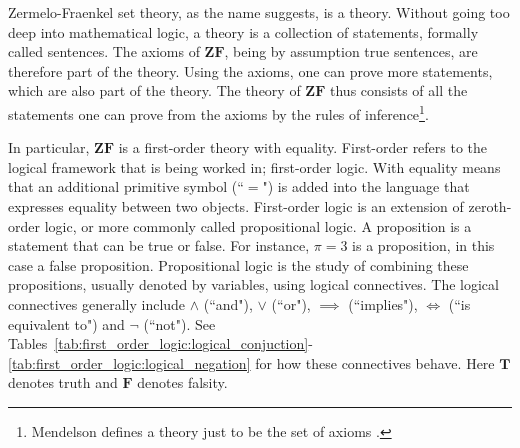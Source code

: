 \documentclass[../main.tex]{subfiles}
\begin{document}
\setcounter{section}{1}
Zermelo-Fraenkel set theory, as the name suggests, is a theory. Without going too deep into mathematical logic, a theory is a collection of statements, formally called sentences. The axioms of $\mathbf{ZF}$, being by assumption true sentences, are therefore part of the theory. Using the axioms, one can prove more statements, which are also part of the theory. The theory of $\mathbf{ZF}$ thus consists of all the statements one can prove from the axioms by the rules of inference\footnote{Mendelson defines a theory just to be the set of axioms \cite{Mendelson1997}.}.

In particular, $\mathbf{ZF}$ is a first-order theory with equality. First-order refers to the logical framework that is being worked in; first-order logic. With equality means that an additional primitive symbol (``$=$") is added into the language that expresses equality between two objects. First-order logic is an extension of zeroth-order logic, or more commonly called propositional logic. A proposition is a statement that can be true or false. For instance, $\pi=3$ is a proposition, in this case a false proposition. Propositional logic is the study of combining these propositions, usually denoted by variables, using logical connectives. The logical connectives generally include $\land$ (``and"), $\lor$ (``or"), $\implies$ (``implies"), $\iff$ (``is equivalent to") and $\lnot$ (``not"). See Tables~\ref{tab:first_order_logic:logical_conjuction}\nobreakdash-\ref{tab:first_order_logic:logical_negation} for how these connectives behave. Here $\mathbf{T}$ denotes truth and $\mathbf{F}$ denotes falsity.
\end{document}
